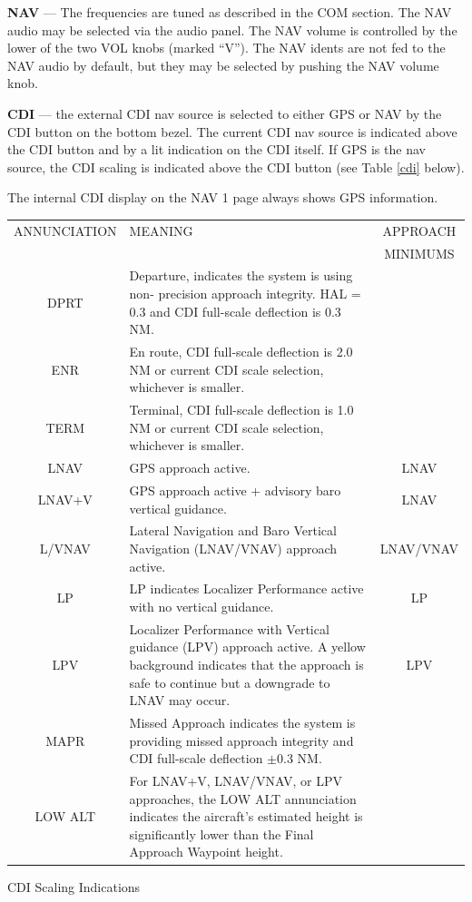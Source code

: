 \textbf{NAV} --- The frequencies are tuned as described in the COM section. The NAV audio may be selected via the audio panel. The NAV volume is controlled by the lower of the two VOL knobs (marked ``V''). The NAV idents are not fed to the NAV audio by default, but they may be selected by pushing the NAV volume knob.

\textbf{CDI} --- the external CDI nav source is selected to either GPS or NAV by the CDI button on the bottom bezel. The current CDI nav source is indicated above the CDI button and by a lit indication on the CDI itself. If GPS is the nav source, the CDI scaling is indicated above the CDI button (see Table \ref{cdi} below).

\begin{Note}
\centering
The internal CDI display on the NAV 1 page always shows GPS information.
\end{Note}
\raggedright

\begin{center}
\begin{tabularx}
  {\textwidth}{|c|X|c|} 
  \hline ANNUNCIATION&MEANING&APPROACH\tabularnewline
  &&MINIMUMS\\
	\hline
	\hline DPRT & Departure, indicates the system is using non- precision approach integrity. HAL = 0.3 and CDI full-scale deflection is 0.3 NM.&\\
	\hline ENR & En route, CDI full-scale deflection is 2.0 NM or current CDI scale selection, whichever is smaller.&\\
	\hline TERM & Terminal, CDI full-scale deflection is 1.0 NM or current CDI scale selection, whichever is smaller.&\\
	\hline LNAV & GPS approach active. &LNAV\\
	\hline LNAV+V & GPS approach active + advisory baro vertical guidance.&LNAV\\
	\hline L/VNAV & Lateral Navigation and Baro Vertical Navigation (LNAV/VNAV) approach active. &LNAV/VNAV\\
	\hline LP & LP indicates Localizer Performance active with no vertical guidance.&LP\\
	\hline LPV & Localizer Performance with Vertical guidance (LPV) approach active.	A yellow background indicates that the approach is safe to continue but a downgrade to LNAV may occur.&LPV\\
	\hline MAPR & Missed Approach indicates the system is providing missed approach integrity and CDI full-scale deflection $\pm $0.3 NM.&\\
  \hline LOW ALT & For LNAV+V, LNAV/VNAV, or LPV approaches, the LOW ALT annunciation indicates the aircraft's estimated height is significantly lower than the Final Approach Waypoint height.&\\
	\hline
\end{tabularx}
\caption{CDI Scaling Indications} \label{cdi}
\end{center}

